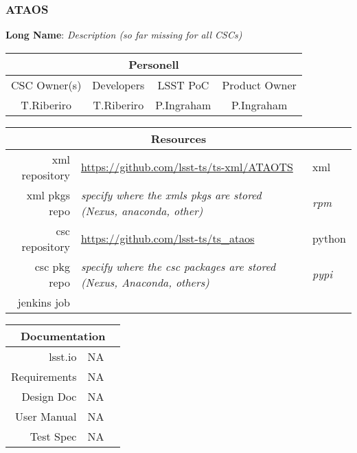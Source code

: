 \subsubsection{ATAOS}

\textbf{Long Name}: \textit{Description (so far missing for all CSCs)}

\begin{longtable}[]{cccc}
\hline
\multicolumn{4}{c}{\textbf{Personell}} \\ \hline
CSC Owner(s) & Developers & LSST PoC   & Product Owner \\ \hline
T.Riberiro   & T.Riberiro & P.Ingraham & P.Ingraham    \\ \hline
\end{longtable}

\begin{longtable}[]{rll}
\hline
\multicolumn{3}{c}{\textbf{Resources}} \\ \hline
xml repository & \url{https://github.com/lsst-ts/ts-xml/ATAOTS} & xml \\ \hline
xml pkgs repo  & \textit{specify where the xmls pkgs are stored (Nexus, anaconda, other)} & \textit{rpm} \\ \hline
csc repository & \url{https://github.com/lsst-ts/ts_ataos} & python \\ \hline
csc pkg repo   & \textit{specify where the csc packages are stored (Nexus, Anaconda, others)} & \textit{pypi}\\ \hline
\hline
jenkins job    & & \\ \hline
\end{longtable}

\begin{longtable}[]{rll}
\hline
\multicolumn{3}{c}{\textbf{Documentation}} \\ \hline
lsst.io & NA & \\ \hline
Requirements & NA & \\ \hline
Design Doc & NA & \\ \hline
User Manual & NA & \\ \hline
Test Spec & NA & \\ \hline
\end{longtable}
